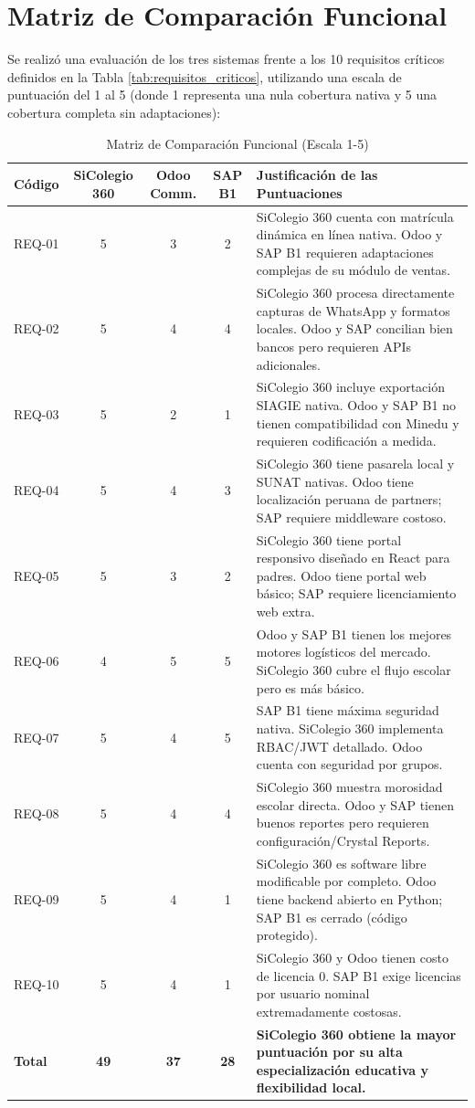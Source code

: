 \documentclass[12pt,a4paper,oneside]{report}
\begin{document}
\section{Matriz de Comparación Funcional}

Se realizó una evaluación de los tres sistemas frente a los 10 requisitos críticos definidos en la Tabla \ref{tab:requisitos_criticos}, utilizando una escala de puntuación del 1 al 5 (donde 1 representa una nula cobertura nativa y 5 una cobertura completa sin adaptaciones):

\begin{table}[H]
\caption{Matriz de Comparación Funcional (Escala 1-5)}
\label{tab:matriz_funcional}
\centering\small
\begin{tabularx}{\textwidth}{l c c c X}
\toprule
\textbf{Código} & \textbf{SiColegio 360} & \textbf{Odoo Comm.} & \textbf{SAP B1} & \textbf{Justificación de las Puntuaciones} \\
\midrule
REQ-01 & 5 & 3 & 2 & SiColegio 360 cuenta con matrícula dinámica en línea nativa. Odoo y SAP B1 requieren adaptaciones complejas de su módulo de ventas. \\
\midrule
REQ-02 & 5 & 4 & 4 & SiColegio 360 procesa directamente capturas de WhatsApp y formatos locales. Odoo y SAP concilian bien bancos pero requieren APIs adicionales. \\
\midrule
REQ-03 & 5 & 2 & 1 & SiColegio 360 incluye exportación SIAGIE nativa. Odoo y SAP B1 no tienen compatibilidad con Minedu y requieren codificación a medida. \\
\midrule
REQ-04 & 5 & 4 & 3 & SiColegio 360 tiene pasarela local y SUNAT nativas. Odoo tiene localización peruana de partners; SAP requiere middleware costoso. \\
\midrule
REQ-05 & 5 & 3 & 2 & SiColegio 360 tiene portal responsivo diseñado en React para padres. Odoo tiene portal web básico; SAP requiere licenciamiento web extra. \\
\midrule
REQ-06 & 4 & 5 & 5 & Odoo y SAP B1 tienen los mejores motores logísticos del mercado. SiColegio 360 cubre el flujo escolar pero es más básico. \\
\midrule
REQ-07 & 5 & 4 & 5 & SAP B1 tiene máxima seguridad nativa. SiColegio 360 implementa RBAC/JWT detallado. Odoo cuenta con seguridad por grupos. \\
\midrule
REQ-08 & 5 & 4 & 4 & SiColegio 360 muestra morosidad escolar directa. Odoo y SAP tienen buenos reportes pero requieren configuración/Crystal Reports. \\
\midrule
REQ-09 & 5 & 4 & 1 & SiColegio 360 es software libre modificable por completo. Odoo tiene backend abierto en Python; SAP B1 es cerrado (código protegido). \\
\midrule
REQ-10 & 5 & 4 & 1 & SiColegio 360 y Odoo tienen costo de licencia 0. SAP B1 exige licencias por usuario nominal extremadamente costosas. \\
\midrule
\textbf{Total} & \textbf{49} & \textbf{37} & \textbf{28} & \textbf{SiColegio 360 obtiene la mayor puntuación por su alta especialización educativa y flexibilidad local.} \\
\bottomrule
\end{tabularx}
\end{table}
\end{document}
